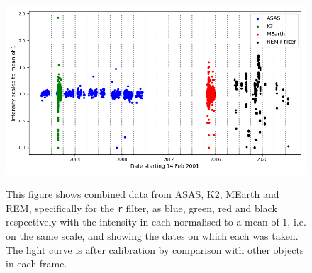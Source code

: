 \begin{figure}[!htbp]
\begin{center}
\includegraphics[scale=0.60]{images/comparison.png} \\
\vspace{-.5cm}
\end{center}   
\caption{This figure shows combined data
from ASAS, K2, MEarth and REM, specifically for the \texttt{r} filter,
as blue, green, red and black respectively with the intensity in each normalised
to a mean of 1, i.e. on the same scale, and showing the dates on which each was
taken. The {\rem} light curve is after
calibration by comparison with other objects
in each frame.}\protect\label{fig:allsourcelcurve}
\end{figure}
\clearpage
%
%
%

